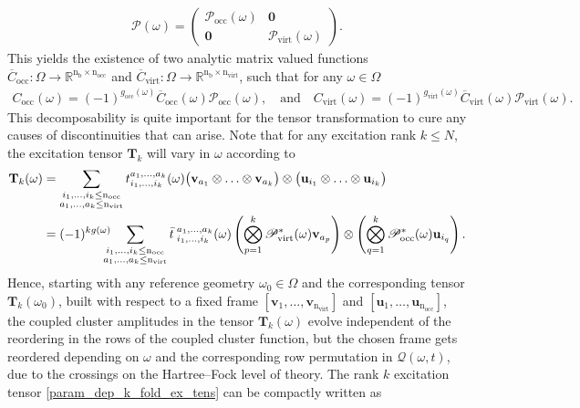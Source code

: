 \documentclass[reqno]{amsart}
\begin{document}
\begin{align}\label{permutation_matrix_func_block}
\mathscr{P}(\omega) = \left( \begin{array}{c|c}
  \mathscr{P}_{\text{occ}}(\omega) & \mathbf{0} \\
  \hline
  \mathbf{0} & \mathscr{P}_{\text{virt}}(\omega)
\end{array} \right).
\end{align}
This yields the existence of two analytic matrix valued functions $\overline{C}_{\text{occ}}:\Omega\longrightarrow \mathbb{R}^{\text{n}_\text{b}\times \text{n}_\text{occ}}$ and $\overline{C}_{\text{virt}}:\Omega\longrightarrow \mathbb{R}^{\text{n}_\text{b}\times \text{n}_\text{virt}}$, such that for any $\omega \in \Omega$
\begin{align}
    C_{\text{occ}}(\omega)=(-1)^{g_{\text{occ}}(\omega)}\overline{C}_{\text{occ}}(\omega)\mathscr{P}_{\text{occ}}(\omega),\quad \text{and}\quad C_{\text{virt}}(\omega)=(-1)^{g_{\text{virt}}(\omega)}\overline{C}_{\text{virt}}(\omega)\mathscr{P}_{\text{virt}}(\omega).
\end{align}
This decomposability is quite important for the tensor transformation to cure any causes of discontinuities that can arise. Note that for any excitation rank $k\le N$, the excitation tensor $\mathbf{T}_k$ will vary in $\omega$ according to
\begin{align}\label{param_dep_k_fold_ex_tens}
    \mathbf{T}_k(\omega)&=\sum_{\substack{i_1,\ldots,i_k\le\text{n}_\text{occ}\\a_1,\ldots,a_{k}\le \text{n}_\text{virt}}} t^{a_1,\ldots,a_k}_{i_1,\ldots,i_k}(\omega) \big( \mathbf{v}_{a_1}\otimes \ldots \otimes \mathbf{v}_{a_k}  \big) \otimes \big(\mathbf{u}_{i_1}\otimes \ldots \otimes \mathbf{u}_{i_k}\big)\\
    &=(-1)^{kg(\omega)}\hspace{-8pt}\sum_{\substack{i_1,\ldots,i_k\le\text{n}_\text{occ}\\a_1,\ldots,a_{k}\le \text{n}_\text{virt}}} \bar{t}^{\;a_1,\ldots,a_k}_{\;i_1,\ldots,i_k}(\omega) \left(\bigotimes^{k}_{p=1}\mathscr{P}^*_{\text{virt}}(\omega)\mathbf{v}_{a_p}   \right) \otimes \left(\bigotimes^{k}_{q=1}\mathscr{P}^*_{\text{occ}}(\omega)\mathbf{u}_{i_q}   \right).
\end{align}
Hence, starting with any reference geometry $\omega_0\in\Omega$ and the corresponding tensor $\mathbf{T}_k(\omega_0)$, built with respect to a fixed frame $[\mathbf{v}_1,\ldots,\mathbf{v}_{\text{n}_{\text{virt}}}]$ and $[\mathbf{u}_1,\ldots,\mathbf{u}_{\text{n}_{\text{occ}}}]$,  the coupled cluster amplitudes in the tensor $\mathbf{T}_k(\omega)$ evolve independent of the reordering in the rows of the coupled cluster function, but the chosen frame gets reordered depending on $\omega$ and the corresponding row permutation in $\mathcal{Q}(\omega,t)$, due to the crossings on the Hartree–Fock level of theory. The rank $k$ excitation tensor \eqref{param_dep_k_fold_ex_tens} can be compactly written as
\end{document}
